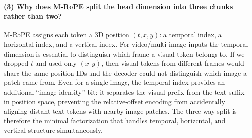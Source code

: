\documentclass[11pt]{article}
\begin{document}
\paragraph{(3) Why does M-RoPE split the head dimension into three chunks
rather than two?}
M-RoPE assigns each token a 3D position $(t, x, y)$: a temporal index, a
horizontal index, and a vertical index.  For video/multi-image inputs the
temporal dimension is essential to distinguish which frame a visual token
belongs to.  If we dropped $t$ and used only $(x, y)$, then visual tokens
from different frames would share the same position IDs and the decoder
could not distinguish which image a patch came from.  Even for a single
image, the temporal index provides an additional ``image identity'' bit: it
separates the visual prefix from the text suffix in position space, preventing
the relative-offset encoding from accidentally aligning distant text tokens
with nearby image patches.  The three-way split is therefore the minimal
factorization that handles temporal, horizontal, and vertical structure
simultaneously.
\end{document}
